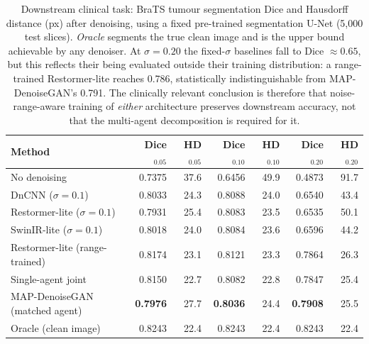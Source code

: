 \begin{table}[!t]
\centering
\caption{Downstream clinical task: BraTS tumour segmentation Dice and Hausdorff distance (px) after denoising, using a fixed pre-trained segmentation U-Net (5{,}000 test slices). \emph{Oracle} segments the true clean image and is the upper bound achievable by any denoiser. At $\sigma=0.20$ the fixed-$\sigma$ baselines fall to Dice $\approx0.65$, but this reflects their being evaluated outside their training distribution: a range-trained Restormer-lite reaches 0.786, statistically indistinguishable from MAP-DenoiseGAN's 0.791. The clinically relevant conclusion is therefore that noise-range-aware training of \emph{either} architecture preserves downstream accuracy, not that the multi-agent decomposition is required for it.}
\label{tab:dice}
\begin{tabular}{lrrrrrr}
\toprule
Method & Dice$_{0.05}$ & HD$_{0.05}$ & Dice$_{0.10}$ & HD$_{0.10}$ & Dice$_{0.20}$ & HD$_{0.20}$ \\
\midrule
No denoising & 0.7375 & 37.6 & 0.6456 & 49.9 & 0.4873 & 91.7 \\
DnCNN ($\sigma{=}0.1$) & 0.8033 & 24.3 & 0.8088 & 24.0 & 0.6540 & 43.4 \\
Restormer-lite ($\sigma{=}0.1$) & 0.7931 & 25.4 & 0.8083 & 23.5 & 0.6535 & 50.1 \\
SwinIR-lite ($\sigma{=}0.1$) & 0.8018 & 24.0 & 0.8084 & 23.6 & 0.6596 & 44.2 \\
Restormer-lite (range-trained) & 0.8174 & 23.1 & 0.8121 & 23.3 & 0.7864 & 26.3 \\
Single-agent joint & 0.8150 & 22.7 & 0.8082 & 22.8 & 0.7847 & 25.4 \\
MAP-DenoiseGAN (matched agent) & \textbf{0.7976} & 27.7 & \textbf{0.8036} & 24.4 & \textbf{0.7908} & 25.5 \\
Oracle (clean image) & 0.8243 & 22.4 & 0.8243 & 22.4 & 0.8243 & 22.4 \\
\bottomrule
\end{tabular}
\end{table}
